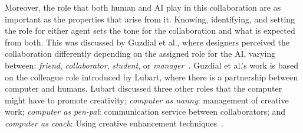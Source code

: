
Moreover, the role that both human and AI play in this collaboration are as important as the properties that arise from it. Knowing, identifying, and setting the role for either agent sets the tone for the collaboration and what is expected from both. This was discussed by Guzdial et al., where designers perceived the collaboration differently depending on the assigned role for the AI, varying between: \emph{friend}, \emph{collaborator}, \emph{student}, or \emph{manager}~\cite{guzdial_friend_2019}. Guzdial et al.'s work is based on the colleague role introduced by Lubart, where there is a partnership between computer and humans. Lubart discussed three other roles that the computer might have to promote creativity; \emph{computer as nanny}: management of creative work; \emph{computer as pen-pal}: communication service between collaborators; and \emph{computer as coach}: Using creative enhancement techniques~\cite{lubart_how_2005}.















